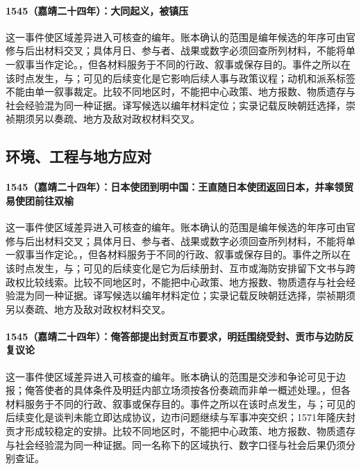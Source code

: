 \paragraph{1545（嘉靖二十四年）：大同起义，被镇压} 这一事件使区域差异进入可核查的编年。账本确认的范围是编年候选的年序可由官修与后出材料交叉；具体月日、参与者、战果或数字必须回查所列材料，不能将单一叙事当作定论。，但各材料服务于不同的行政、叙事或保存目的。事件之所以在该时点发生，与；可见的后续变化是它影响后续人事与政策议程；动机和派系标签不能由单一叙事裁定。比较不同地区时，不能把中心政策、地方报数、物质遗存与社会经验混为同一种证据。译写候选以编年材料定位；实录记载反映朝廷选择，崇祯期须另以奏疏、地方及敌对政权材料交叉。

\subsection{环境、工程与地方应对}

\paragraph{1545（嘉靖二十四年）：日本使团到明中国：王直随日本使团返回日本，并率领贸易使团前往双榆} 这一事件使区域差异进入可核查的编年。账本确认的范围是编年候选的年序可由官修与后出材料交叉；具体月日、参与者、战果或数字必须回查所列材料，不能将单一叙事当作定论。，但各材料服务于不同的行政、叙事或保存目的。事件之所以在该时点发生，与；可见的后续变化是它为后续册封、互市或海防安排留下文书与跨政权比较线索。比较不同地区时，不能把中心政策、地方报数、物质遗存与社会经验混为同一种证据。译写候选以编年材料定位；实录记载反映朝廷选择，崇祯期须另以奏疏、地方及敌对政权材料交叉。

\paragraph{1545（嘉靖二十四年）：俺答部提出封贡互市要求，明廷围绕受封、贡市与边防反复议论} 这一事件使区域差异进入可核查的编年。账本确认的范围是交涉和争论可见于边报；俺答使者的具体条件及明廷内部立场须按各份奏疏而非单一概述处理。，但各材料服务于不同的行政、叙事或保存目的。事件之所以在该时点发生，与；可见的后续变化是谈判未能立即达成协议，边市问题继续与军事冲突交织；1571年隆庆封贡才形成较稳定的安排。比较不同地区时，不能把中心政策、地方报数、物质遗存与社会经验混为同一种证据。同一名称下的区域执行、数字口径与社会后果仍须分别查证。

